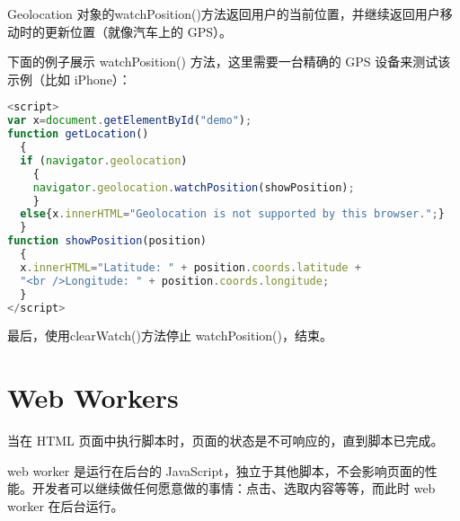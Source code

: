 Geolocation 对象的watchPosition()方法返回用户的当前位置，并继续返回用户移动时的更新位置（就像汽车上的 GPS）。

下面的例子展示 watchPosition() 方法，这里需要一台精确的 GPS 设备来测试该示例（比如 iPhone）：

\begin{lstlisting}[language=JavaScript]
<script>
var x=document.getElementById("demo");
function getLocation()
  {
  if (navigator.geolocation)
    {
    navigator.geolocation.watchPosition(showPosition);
    }
  else{x.innerHTML="Geolocation is not supported by this browser.";}
  }
function showPosition(position)
  {
  x.innerHTML="Latitude: " + position.coords.latitude +
  "<br />Longitude: " + position.coords.longitude;
  }
</script>
\end{lstlisting}

最后，使用clearWatch()方法停止 watchPosition()，结束。


\section{Web Workers}

当在 HTML 页面中执行脚本时，页面的状态是不可响应的，直到脚本已完成。

web worker 是运行在后台的 JavaScript，独立于其他脚本，不会影响页面的性能。开发者可以继续做任何愿意做的事情：点击、选取内容等等，而此时 web worker 在后台运行。


